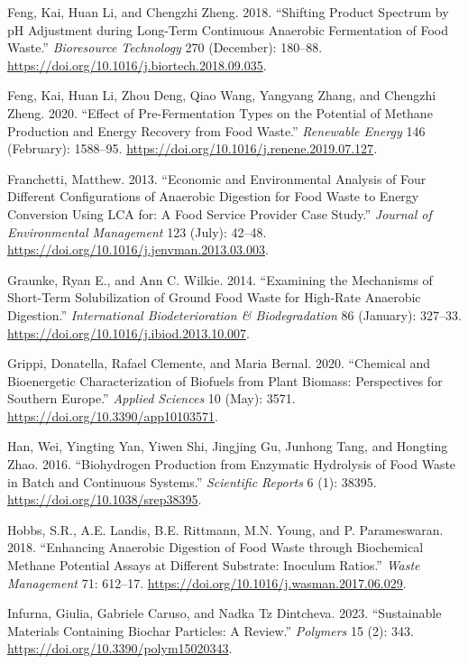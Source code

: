 \documentclass[11pt]{report}
\begin{document}
\begin{hangparas}{1.5em}{1}
\hypertarget{citeproc_bib_item_15}{Feng, Kai, Huan Li, and Chengzhi Zheng. 2018. “Shifting Product Spectrum by pH Adjustment during Long-Term Continuous Anaerobic Fermentation of Food Waste.” \textit{Bioresource Technology} 270 (December): 180–88. \url{https://doi.org/10.1016/j.biortech.2018.09.035}.}

\hypertarget{citeproc_bib_item_16}{Feng, Kai, Huan Li, Zhou Deng, Qiao Wang, Yangyang Zhang, and Chengzhi Zheng. 2020. “Effect of Pre-Fermentation Types on the Potential of Methane Production and Energy Recovery from Food Waste.” \textit{Renewable Energy} 146 (February): 1588–95. \url{https://doi.org/10.1016/j.renene.2019.07.127}.}

\hypertarget{citeproc_bib_item_17}{Franchetti, Matthew. 2013. “Economic and Environmental Analysis of Four Different Configurations of Anaerobic Digestion for Food Waste to Energy Conversion Using LCA for: A Food Service Provider Case Study.” \textit{Journal of Environmental Management} 123 (July): 42–48. \url{https://doi.org/10.1016/j.jenvman.2013.03.003}.}

\hypertarget{citeproc_bib_item_18}{Graunke, Ryan E., and Ann C. Wilkie. 2014. “Examining the Mechanisms of Short-Term Solubilization of Ground Food Waste for High-Rate Anaerobic Digestion.” \textit{International Biodeterioration \& Biodegradation} 86 (January): 327–33. \url{https://doi.org/10.1016/j.ibiod.2013.10.007}.}

\hypertarget{citeproc_bib_item_19}{Grippi, Donatella, Rafael Clemente, and Maria Bernal. 2020. “Chemical and Bioenergetic Characterization of Biofuels from Plant Biomass: Perspectives for Southern Europe.” \textit{Applied Sciences} 10 (May): 3571. \url{https://doi.org/10.3390/app10103571}.}

\hypertarget{citeproc_bib_item_20}{Han, Wei, Yingting Yan, Yiwen Shi, Jingjing Gu, Junhong Tang, and Hongting Zhao. 2016. “Biohydrogen Production from Enzymatic Hydrolysis of Food Waste in Batch and Continuous Systems.” \textit{Scientific Reports} 6 (1): 38395. \url{https://doi.org/10.1038/srep38395}.}

\hypertarget{citeproc_bib_item_21}{Hobbs, S.R., A.E. Landis, B.E. Rittmann, M.N. Young, and P. Parameswaran. 2018. “Enhancing Anaerobic Digestion of Food Waste through Biochemical Methane Potential Assays at Different Substrate: Inoculum Ratios.” \textit{Waste Management} 71: 612–17. \url{https://doi.org/10.1016/j.wasman.2017.06.029}.}

\hypertarget{citeproc_bib_item_22}{Infurna, Giulia, Gabriele Caruso, and Nadka Tz Dintcheva. 2023. “Sustainable Materials Containing Biochar Particles: A Review.” \textit{Polymers} 15 (2): 343. \url{https://doi.org/10.3390/polym15020343}.}


\end{hangparas}
\end{document}
